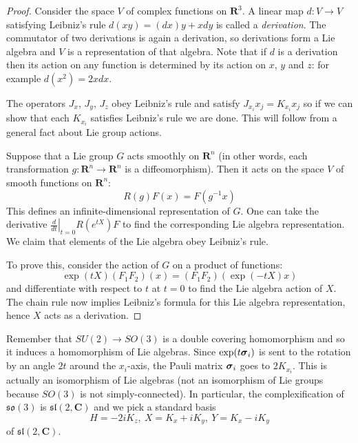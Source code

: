 \documentclass[12pt]{article}
\renewcommand\vec[1]{\ensuremath\boldsymbol{#1}}
\newcommand{\CC}{\mathbf{C}}
\newcommand{\RR}{\mathbf{R}}
\theoremstyle{definition}
\theoremstyle{check}
\theoremstyle{remark}
\theoremstyle{TheoremNum}
\begin{document}
\begin{proof}
Consider the space $V$ of complex functions on $\RR^3$. A linear map $d\colon V\to V$ satisfying Leibniz's rule $d(xy)=(dx)y+xdy$ is called a {\em derivation}. The commutator of two derivations is again a derivation, so derivations form a Lie algebra and $V$ is a representation of that algebra. Note that if $d$ is a derivation then its action on any function is determined by its action on $x$, $y$ and $z$: for example $d(x^2)=2xdx$.

The operators $J_x$, $J_y$, $J_z$ obey Leibniz's rule and satisfy $J_{x_i}x_j=K_{x_i}x_j$ so if we can show that each $K_{x_i}$ satisfies Leibniz's rule we are done. This will follow from a general fact about Lie group actions.

Suppose that a Lie group $G$ acts smoothly on $\RR^n$ (in other words, each transformation $g\colon\RR^n\to\RR^n$ is a diffeomorphism). Then it acts on the space $V$ of smooth functions on $\RR^n$:
\[R(g)F(x)=F(g^{-1}x)\]
This defines an infinite-dimensional representation of $G$. One can take the derivative $\left.\tfrac{d}{dt}\right|_{t=0}R(e^{tX})F$ to find the corresponding Lie algebra representation. We claim that elements of the Lie algebra obey Leibniz's rule.

To prove this, consider the action of $G$ on a product of functions:
\[\exp(tX)(F_1F_2)(x)=(F_1F_2)(\exp(-tX)x)\]
and differentiate with respect to $t$ at $t=0$ to find the Lie algebra action of $X$. The chain rule now implies Leibniz's formula for this Lie algebra representation, hence $X$ acts as a derivation.
\end{proof}

Remember that $SU(2)\to SO(3)$ is a double covering homomorphism and so it induces a homomorphism of Lie algebras. Since $\exp(t\vec{\sigma}_i)$ is sent to the rotation by an angle $2t$ around the $x_i$-axis, the Pauli matrix $\vec{\sigma}_i$ goes to $2K_{x_i}$. This is actually an isomorphism of Lie algebras (not an isomorphism of Lie groups because $SO(3)$ is not simply-connected). In particular, the complexification of $\mathfrak{so}(3)$ is $\mathfrak{sl}(2,\CC)$ and we pick a standard basis
\[H=-2iK_z,\ X=K_x+iK_y,\ Y=K_x-iK_y\]
of $\mathfrak{sl}(2,\CC)$.
\end{document}
